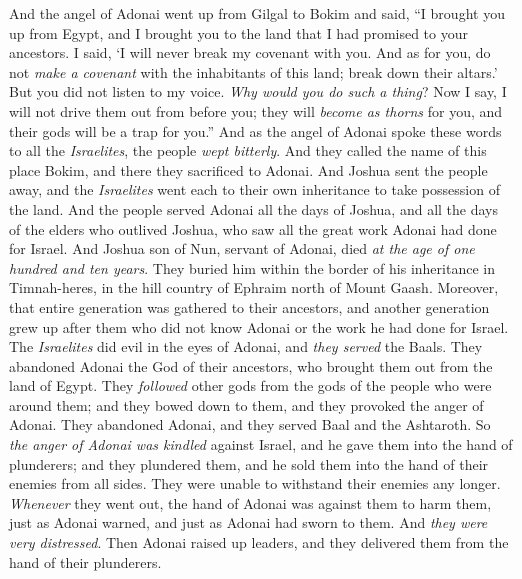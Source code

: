 \begin{biblechapter} %
 And the angel of Adonai went up from Gilgal to Bokim and said, “I brought you up from Egypt, and I brought you to the land that I had promised to your ancestors. I said, ‘I will never break my covenant with you.
\verse And as for you, do not \textit{make a covenant} with the inhabitants of this land; break down their altars.’ But you did not listen to my voice. \textit{Why would you do such a thing}?
\verse Now I say, I will not drive them out from before you; they will \textit{become as thorns} for you, and their gods will be a trap for you.”
\verse And as the angel of Adonai spoke these words to all the \textit{Israelites}, the people \textit{wept bitterly}.
\verse And they called the name of this place Bokim, and there they sacrificed to Adonai.
 And Joshua sent the people away, and the \textit{Israelites} went each to their own inheritance to take possession of the land.
\verse And the people served Adonai all the days of Joshua, and all the days of the elders who outlived Joshua, who saw all the great work Adonai had done for Israel.
\verse And Joshua son of Nun, servant of Adonai, died \textit{at the age of one hundred and ten years}.
\verse They buried him within the border of his inheritance in Timnah-heres, in the hill country of Ephraim north of Mount Gaash.
\verse Moreover, that entire generation was gathered to their ancestors, and another generation grew up after them who did not know Adonai or the work he had done for Israel.
 The \textit{Israelites} did evil in the eyes of Adonai, and \textit{they served} the Baals.
\verse They abandoned Adonai the God of their ancestors, who brought them out from the land of Egypt. They \textit{followed} other gods from the gods of the people who were around them; and they bowed down to them, and they provoked the anger of Adonai.
\verse They abandoned Adonai, and they served Baal and the Ashtaroth.
\verse So \textit{the anger of Adonai was kindled} against Israel, and he gave them into the hand of plunderers; and they plundered them, and he sold them into the hand of their enemies from all sides. They were unable to withstand their enemies any longer.
\verse \textit{Whenever} they went out, the hand of Adonai was against them to harm them, just as Adonai warned, and just as Adonai had sworn to them. And \textit{they were very distressed}.
\verse Then Adonai raised up leaders, and they delivered them from the hand of their plunderers.

\end{biblechapter}
